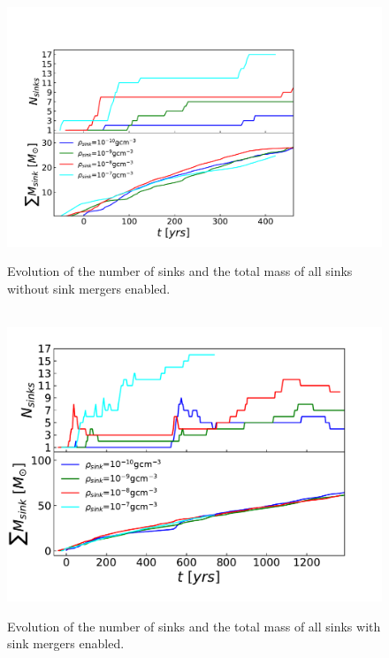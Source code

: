 \documentclass[fleqn,usenatbib]{mnras}
\begin{document}
\begin{figure}
	\hbox{\hspace{-0.8cm} \includegraphics[scale=0.5]{sinks_nomergers.pdf}}
    \caption{Evolution of the number of sinks and the total mass of all sinks without sink mergers enabled.}
    \label{fig:sinks_nomerge}
\end{figure}

\begin{figure}
	\hbox{\hspace{-0.9cm} \includegraphics[scale=0.54]{sink_mergers.pdf}}
    \caption{Evolution of the number of sinks and the total mass of all sinks with sink mergers enabled.}
    \label{fig:sinks}
\end{figure}
\end{document}
